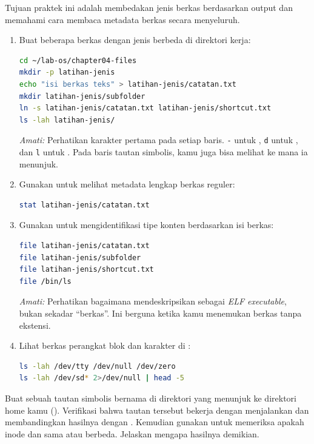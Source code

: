 Tujuan praktek ini adalah membedakan jenis berkas berdasarkan output  dan
memahami cara membaca metadata berkas secara menyeluruh.

\begin{enumerate}
    \item Buat beberapa berkas dengan jenis berbeda di direktori kerja:
\begin{lstlisting}[language=bash, caption={Membuat berkas reguler dan direktori}]
cd ~/lab-os/chapter04-files
mkdir -p latihan-jenis
echo "isi berkas teks" > latihan-jenis/catatan.txt
mkdir latihan-jenis/subfolder
ln -s latihan-jenis/catatan.txt latihan-jenis/shortcut.txt
ls -lah latihan-jenis/
\end{lstlisting}
    \textit{Amati:} Perhatikan karakter pertama pada setiap baris. \texttt{-} untuk , \texttt{d} untuk , dan \texttt{l} untuk . Pada baris tautan simbolis, kamu juga bisa melihat ke mana ia menunjuk.

    \item Gunakan  untuk melihat metadata lengkap berkas reguler:
\begin{lstlisting}[language=bash, caption={Melihat metadata lengkap dengan stat}]
stat latihan-jenis/catatan.txt
\end{lstlisting}

    \item Gunakan  untuk mengidentifikasi tipe konten berdasarkan isi berkas:
\begin{lstlisting}[language=bash, caption={Mendeteksi tipe berkas dengan file}]
file latihan-jenis/catatan.txt
file latihan-jenis/subfolder
file latihan-jenis/shortcut.txt
file /bin/ls
\end{lstlisting}
    \textit{Amati:} Perhatikan bagaimana  mendeskripsikan  sebagai \textit{ELF executable}, bukan sekadar ``berkas''. Ini berguna ketika kamu menemukan berkas tanpa ekstensi.

    \item Lihat berkas perangkat blok dan karakter di :
\begin{lstlisting}[language=bash, caption={Melihat berkas perangkat di /dev}]
ls -lah /dev/tty /dev/null /dev/zero
ls -lah /dev/sd* 2>/dev/null | head -5
\end{lstlisting}
\end{enumerate}

\begin{challengebox}
Buat sebuah tautan simbolis bernama  di direktori 
yang menunjuk ke direktori home kamu (\dir{~/}). Verifikasi bahwa tautan tersebut bekerja
dengan menjalankan  dan membandingkan hasilnya dengan .
Kemudian gunakan  untuk memeriksa apakah inode  dan \dir{~/}
sama atau berbeda. Jelaskan mengapa hasilnya demikian.
\end{challengebox}

